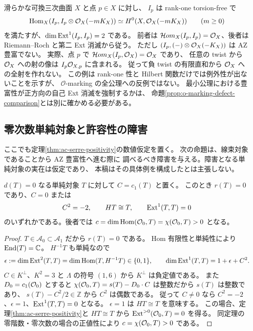 \begin{remark}
\label{rem:o-ideal-sheaf-test}
滑らかな可換三次曲面 $X$ と点 $p\in X$ に対し、
$I_p$ は rank-one torsion-free で
\[
 \operatorname{Hom}_X(I_p,I_p\otimes\mathcal O_X(-mK_X))
 \simeq H^0(X,\mathcal O_X(-mK_X))\qquad(m\ge0)
\]
を満たすが、$\dim\operatorname{Ext}^1(I_p,I_p)=2$ である。
前者は $\mathcal Hom_X(I_p,I_p)=\mathcal O_X$、後者は
Riemann--Roch と第二 Ext 消滅から従う。
ただし $(I_p,(-)\otimes\mathcal O_X(-K_X))$ は AZ 豊富でない。
実際、点 $p$ で $\mathcal Hom_X(I_p,\mathcal O_X)=\mathcal O_X$ であり、
任意の twist から $\mathcal O_X$ への射の像は $I_p\mathcal O_{X,p}$ に含まれる。
従って負 twist の有限直和から $\mathcal O_X$ への全射を作れない。
この例は rank-one 性と Hilbert 関数だけでは例外性が出ないことを示すが、
$\mathcal O$-marking の全公理への反例ではない。
最小公理における豊富性が正方向の自己 Ext 消滅を強制するかは、
命題\ref{prop:o-marking-defect-comparison}とは別に確かめる必要がある。
\end{remark}

\subsection{零次数単純対象と許容性の障害}
ここでも定理\ref{thm:ac-serre-positivity}の数値仮定を置く。
次の命題は、線束対象であることから AZ 豊富性へ進む際に
調べるべき障害を与える。障害となる単純対象の実在は仮定であり、
本稿はその具体例を構成したとは主張しない。

\begin{lemma}[零次数単純対象の数値類]\label{lem:zero-degree-simple-classification}
$d(T)=0$ なる単純対象 $T$ に対して $C=c_1(T)$ と置く。
このとき $r(T)=0$ であり、$C=0$ または
\[
 C^2=-2,\qquad HT\cong T,\qquad \operatorname{Ext}^1(T,T)=0
\]
のいずれかである。後者では
$c=\dim\operatorname{Hom}(\mathcal O_0,T)=\chi(\mathcal O_0,T)>0$ となる。
\end{lemma}
\begin{proof}
$T\in\mathcal A_0\subset\mathcal A_1$ だから $r(T)=0$ である。
Hom 有限性と単純性により $\operatorname{End}(T)=\mathbb C$。
$H^{-1}T$ も単純なので
\[
 \epsilon:=\dim\operatorname{Ext}^2(T,T)=\dim\operatorname{Hom}(T,H^{-1}T)\in\{0,1\},
 \qquad \dim\operatorname{Ext}^1(T,T)=1+\epsilon+C^2.
\]
$C\in K^\perp$、$K^2=3$ と $\Lambda$ の符号 $(1,6)$ から
$K^\perp$ は負定値である。
また $D_0=c_1(\mathcal O_0)$ とすると
$\chi(\mathcal O_0,T)=s(T)-D_0\cdot C$ は整数だから $s(T)$ は整数であり、
$s(T)-C^2/2\in\mathbb Z$ から $C^2$ は偶数である。
従って $C\ne0$ なら $C^2=-2$、$\epsilon=1$、$\operatorname{Ext}^1(T,T)=0$ となる。
$\epsilon=1$ は $HT\cong T$ を意味する。
この場合、定理\ref{thm:ac-serre-positivity}と $HT\cong T$ から
$\operatorname{Ext}^{>0}(\mathcal O_0,T)=0$ を得る。
同定理の零階数・零次数の場合の正値性により
$c=\chi(\mathcal O_0,T)>0$ である。
\end{proof}

